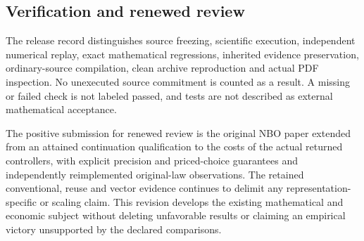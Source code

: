 \hypertarget{verification-and-renewed-review}{%
\subsection{Verification and renewed
review}\label{verification-and-renewed-review}}

The release record distinguishes source freezing, scientific execution,
independent numerical replay, exact mathematical regressions, inherited
evidence preservation, ordinary-source compilation, clean archive
reproduction and actual PDF inspection. No unexecuted source commitment
is counted as a result. A missing or failed check is not labeled passed,
and tests are not described as external mathematical acceptance.

The positive submission for renewed review is the original NBO paper
extended from an attained continuation qualification to the costs of the
actual returned controllers, with explicit precision and priced-choice
guarantees and independently reimplemented original-law observations.
The retained conventional, reuse and vector evidence continues to
delimit any representation-specific or scaling claim. This revision
develops the existing mathematical and economic subject without deleting
unfavorable results or claiming an empirical victory unsupported by the
declared comparisons.
